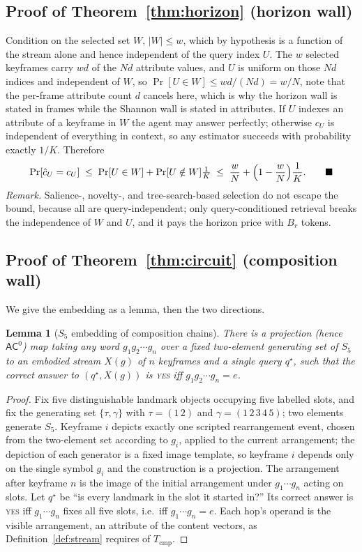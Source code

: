 \documentclass[10pt]{article}
\newtheorem{lemma}{Lemma}
\theoremstyle{definition}
\theoremstyle{plain}
\newcommand{\qedmark}{\ensuremath{\blacksquare}}
\newcommand{\proofenddisp}{\tag*{\qedmark}}
\begin{document}
\subsection{Proof of Theorem~\ref{thm:horizon} (horizon wall)}
Condition on the selected set $W$, $|W|\le w$, which by hypothesis is a function of the stream alone and hence independent of the query index $U$. The $w$ selected keyframes carry $wd$ of the $Nd$ attribute values, and $U$ is uniform on those $Nd$ indices and independent of $W$, so $\Pr[U\in W]\le wd/(Nd)=w/N$, note that the per-frame attribute count $d$ cancels here, which is why the horizon wall is stated in frames while the Shannon wall is stated in attributes. If $U$ indexes an attribute of a keyframe in $W$ the agent may answer perfectly; otherwise $c_U$ is independent of everything in context, so any estimator succeeds with probability exactly $1/K$. Therefore
\begin{equation*}
\Pr[\hat c_U=c_U]\;\le\;\Pr[U\in W]+\Pr[U\notin W]\tfrac1K\;\le\;\frac wN+\Bigl(1-\frac wN\Bigr)\frac1K. \proofenddisp
\end{equation*}
\emph{Remark.} Salience-, novelty-, and tree-search-based selection do not escape the bound, because all are query-independent; only query-conditioned retrieval breaks the independence of $W$ and $U$, and it pays the horizon price with $B_r$ tokens.

\subsection{Proof of Theorem~\ref{thm:circuit} (composition wall)}
We give the embedding as a lemma, then the two directions.

\begin{lemma}[$S_5$ embedding of composition chains]
\label{lem:s5}
There is a projection (hence $\mathsf{AC}^0$) map taking any word $g_1g_2\cdots g_n$ over a fixed two-element generating set of $S_5$ to an embodied stream $X(g)$ of $n$ keyframes and a single query $q^{\star}$, such that the correct answer to $(q^{\star},X(g))$ is \textsc{yes} iff $g_1g_2\cdots g_n=e$.
\end{lemma}
\begin{proof}
Fix five distinguishable landmark objects occupying five labelled slots, and fix the generating set $\{\tau,\gamma\}$ with $\tau=(1\,2)$ and $\gamma=(1\,2\,3\,4\,5)$; two elements generate $S_5$. Keyframe $i$ depicts exactly one scripted rearrangement event, chosen from the two-element set according to $g_i$, applied to the current arrangement; the depiction of each generator is a fixed image template, so keyframe $i$ depends only on the single symbol $g_i$ and the construction is a projection. The arrangement after keyframe $n$ is the image of the initial arrangement under $g_1\cdots g_n$ acting on slots. Let $q^{\star}$ be ``is every landmark in the slot it started in?'' Its correct answer is \textsc{yes} iff $g_1\cdots g_n$ fixes all five slots, i.e.\ iff $g_1\cdots g_n=e$. Each hop's operand is the visible arrangement, an attribute of the content vectors, as Definition~\ref{def:stream} requires of $T_{\mathrm{cmp}}$.
\end{proof}
\end{document}
